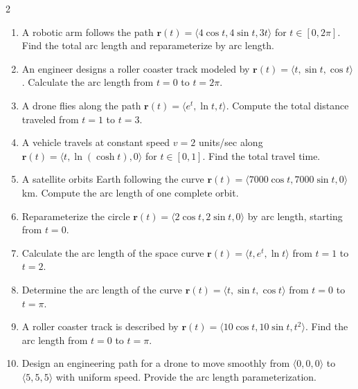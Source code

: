\begin{multicols}{2}
\begin{enumerate}
    \item A robotic arm follows the path \( \mathbf{r}(t) = \langle 4\cos t, 4\sin t, 3t \rangle \) for \( t \in [0, 2\pi] \). Find the total arc length and reparameterize by arc length.
    \item An engineer designs a roller coaster track modeled by \( \mathbf{r}(t) = \langle t, \sin t, \cos t \rangle \). Calculate the arc length from \( t = 0 \) to \( t = 2\pi \).
    \item A drone flies along the path \( \mathbf{r}(t) = \langle e^t, \ln t, t \rangle \). Compute the total distance traveled from \( t = 1 \) to \( t = 3 \).
    \item A vehicle travels at constant speed \( v = 2 \) units/sec along \( \mathbf{r}(t) = \langle t, \ln(\cosh t), 0 \rangle \) for \( t \in [0, 1] \). Find the total travel time.
    \item A satellite orbits Earth following the curve \( \mathbf{r}(t) = \langle 7000\cos t, 7000\sin t, 0 \rangle \) km. Compute the arc length of one complete orbit.
    \item Reparameterize the circle \( \mathbf{r}(t) = \langle 2\cos t, 2\sin t, 0 \rangle \) by arc length, starting from \( t = 0 \).
    \item Calculate the arc length of the space curve \( \mathbf{r}(t) = \langle t, e^t, \ln t \rangle \) from \( t = 1 \) to \( t = 2 \).
    \item Determine the arc length of the curve \( \mathbf{r}(t) = \langle t, \sin t, \cos t \rangle \) from \( t = 0 \) to \( t = \pi \).
    \item A roller coaster track is described by \( \mathbf{r}(t) = \langle 10\cos t, 10\sin t, t^2 \rangle \). Find the arc length from \( t = 0 \) to \( t = \pi \).
    \item Design an engineering path for a drone to move smoothly from \( \langle 0, 0, 0 \rangle \) to \( \langle 5, 5, 5 \rangle \) with uniform speed. Provide the arc length parameterization.


\end{enumerate}
\end{multicols}
